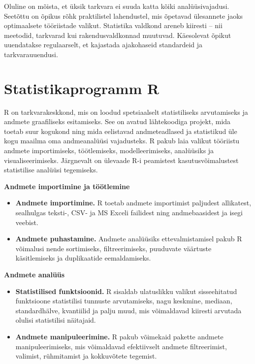 \documentclass[
]{book}
\providecommand{\tightlist}{%
  \setlength{\itemsep}{0pt}\setlength{\parskip}{0pt}}
\begin{document}
Oluline on mõista, et üksik tarkvara ei suuda katta kõiki analüüsivajadusi. Seetõttu on õpikus rõhk praktilistel lahendustel, mis õpetavad ülesannete jaoks optimaalsete tööriistade valikut. Statistika valdkond areneb kiiresti -- nii meetodid, tarkvarad kui rakendusvaldkonnad muutuvad. Käesolevat õpikut uuendatakse regulaarselt, et kajastada ajakohaseid standardeid ja tarkvarauuendusi.

\section{Statistikaprogramm R}\label{statistikaprogramm-r}

R on tarkvarakeskkond, mis on loodud spetsiaalselt statistiliseks arvutamiseks ja andmete graafiliseks esitamiseks. See on avatud lähtekoodiga projekt, mida toetab suur kogukond ning mida eelistavad andmeteadlased ja statistikud üle kogu maailma oma andmeanalüüsi vajadusteks. R pakub laia valikut tööriistu andmete importimiseks, töötlemiseks, modelleerimiseks, analüüsiks ja visualiseerimiseks. Järgnevalt on ülevaade R-i peamistest kasutusvõimalustest statistilise analüüsi tegemiseks.

\textbf{Andmete importimine ja töötlemine}

\begin{itemize}
\tightlist
\item
  \textbf{Andmete importimine.} R toetab andmete importimist paljudest allikatest, sealhulgas teksti-, CSV- ja MS Exceli failidest ning andmebaasidest ja isegi veebist.
\item
  \textbf{Andmete puhastamine.} Andmete analüüsiks ettevalmistamisel pakub R võimalusi nende sortimiseks, filtreerimiseks, puuduvate väärtuste käsitlemiseks ja duplikaatide eemaldamiseks.
\end{itemize}

\textbf{Andmete analüüs}

\begin{itemize}
\tightlist
\item
  \textbf{Statistilised funktsioonid.} R sisaldab ulatuslikku valikut sisseehitatud funktsioone statistilisi tunnuste arvutamiseks, nagu keskmine, mediaan, standardhälve, kvantiilid ja palju muud, mis võimaldavad kiiresti arvutada olulisi statistilisi näitajaid.
\item
  \textbf{Andmete manipuleerimine.} R pakub võimekaid pakette andmete manipuleerimiseks, mis võimaldavad efektiivselt andmete filtreerimist, valimist, rühmitamist ja kokkuvõtete tegemist.
\end{itemize}
\end{document}
